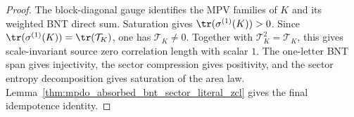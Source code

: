 \begin{proof}\leanok
    The block-diagonal gauge identifies the MPV families of $K$ and its
    weighted BNT direct sum. Saturation gives $\tr(\sigma^{(1)}(K))>0$. Since
    $\tr(\sigma^{(1)}(K))=\tr(\mathcal T_K)$, one has
    $\mathcal T_K\ne0$. Together with $\mathcal T_K^2=\mathcal T_K$, this
    gives scale-invariant source zero correlation length with scalar $1$.
    The one-letter BNT span gives injectivity, the sector compression gives
    positivity, and the sector entropy decomposition gives saturation of the
    area law. Lemma~\ref{thm:mpdo_absorbed_bnt_sector_literal_zcl} gives
    the final idempotence identity.
\end{proof}

